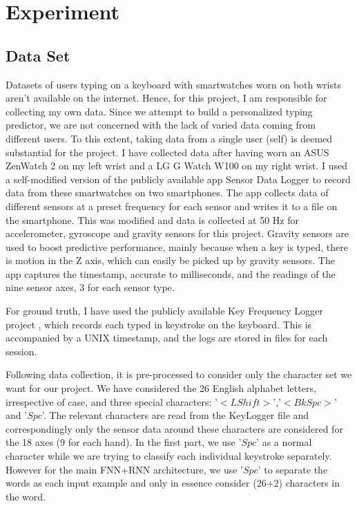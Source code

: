 \documentclass[10pt,twocolumn,letterpaper]{article}
\begin{document}
\section{Experiment}

\subsection{Data Set}
Datasets of users typing on a keyboard with smartwatches worn on both wrists aren't available on the internet. Hence, for this project, I am responsible for collecting my own data. Since we attempt to build a personalized typing predictor, we are not concerned with the lack of varied data coming from different users. To this extent, taking data from a single user (self) is deemed substantial for the project. I have collected data after having worn an ASUS ZenWatch 2 on my left wrist and a LG G Watch W100 on my right wrist. I used a self-modified version of the publicly available app Sensor Data Logger \cite{app} to record data from these smartwatches on two smartphones. The app collects data of different sensors at a preset frequency for each sensor and writes it to a file on the smartphone. This was modified and data is collected at 50 Hz for accelerometer, gyroscope and gravity sensors for this project. Gravity sensors are used to boost predictive performance, mainly because when a key is typed, there is motion in the Z axis, which can easily be picked up by gravity sensors. The app \cite{app} captures the timestamp, accurate to milliseconds, and the readings of the nine sensor axes, 3 for each sensor type.

For ground truth, I have used the publicly available Key Frequency Logger project \cite{keyfreq}, which records each typed in keystroke on the keyboard. This is accompanied by a UNIX timestamp, and the logs are stored in files for each session.

Following data collection, it is pre-processed to consider only the character set we want for our project. We have considered the 26 English alphabet letters, irrespective of case, and three special characters: '$<LShift>$','$<BkSpc>$' and '$Spc$'. The relevant characters are read from the KeyLogger file and correspondingly only the sensor data around these characters are considered for the 18 axes (9 for each hand). In the first part, we use '$Spc$' as a normal character while we are trying to classify each individual keystroke separately. However for the main FNN+RNN architecture, we use '$Spc$' to separate the words as each input example and only in essence consider (26+2) characters in the word.
\end{document}
